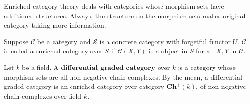 Enriched category theory deals with categories whose morphism sets have additional structures. Always, the structure on the morphism sets makes original category taking more information.
\begin{mydefn}
Suppose $\mathcal{C}$ be a category and $\mathcal{S}$ is a concrete category with forgetful functor $U$.  $\mathcal{C}$ is called a enriched category over $S$ if $\mathcal{C}(X,Y)$ is a object in $S$ for all $X,Y$ in $\mathcal{C}$.
\end{mydefn}
\begin{ex}
Let $k$ be a field. A \textbf{differential graded category} over $k$ is a category whose morphism sets are all non-negative chain complexes. By the mean, a differential graded category is an enriched category over category $\mathbf{Ch}^{+}(k)$, of non-negative chain complexes over field $k$.
\end{ex}